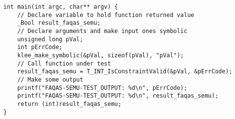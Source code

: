 
\begin{lstlisting}[float=h, style=CStyle, caption=SEMuS test template., label=test_template]
int main(int argc, char** argv) {
    // Declare variable to hold function returned value
    _Bool result_faqas_semu; 
    // Declare arguments and make input ones symbolic
    unsigned long pVal;
    int pErrCode;
    klee_make_symbolic(&pVal, sizeof(pVal), "pVal"); 
    // Call function under test
    result_faqas_semu = T_INT_IsConstraintValid(&pVal, &pErrCode); 
    // Make some output
    printf("FAQAS-SEMU-TEST_OUTPUT: %d\n", pErrCode);
    printf("FAQAS-SEMU-TEST_OUTPUT: %d\n", result_faqas_semu);
    return (int)result_faqas_semu;
}

\end{lstlisting}